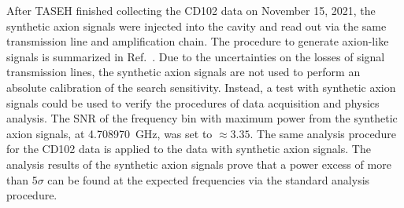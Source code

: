 After TASEH finished collecting the CD102 data on November 15, 2021, 
the synthetic axion signals were injected into the cavity and read out via the 
same transmission line and amplification chain. The procedure 
to generate axion-like signals is summarized in 
Ref.~\cite{TASEHInstrumentation}. 
Due to the uncertainties on the losses of signal transmission
 lines, the synthetic axion signals are not used to perform an absolute 
calibration of the search sensitivity. Instead, 
a test with synthetic axion signals could be used to verify the procedures of 
data acquisition and physics analysis. The 
SNR of the frequency bin with maximum power from the 
synthetic axion signals, at 4.708970~GHz, was set to $\approx 3.35$.%
%
The same analysis procedure for the CD102 data is applied 
to the data with synthetic axion signals. 
The analysis results of the synthetic axion signals prove that a power 
excess of more than 5$\sigma$ can be found at the expected frequencies via 
the standard analysis procedure.  

   
